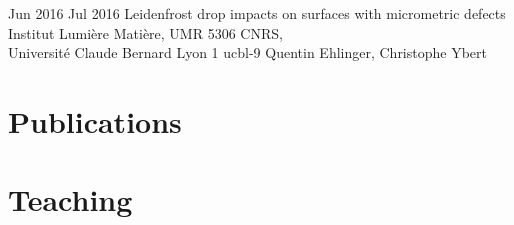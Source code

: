 \documentclass[letterpaper]{cvtemplate_en} %
\begin{document}
\begin{cvbody}
\cvitem
	{Jun 2016}
	{Jul 2016}
	{Leidenfrost drop impacts on surfaces with micrometric defects}
	{Institut Lumi\`ere Mati\`ere, UMR 5306 CNRS,\\
	Universit\'e Claude Bernard Lyon 1 }
	{ucbl}{}{-9}
	{Quentin Ehlinger, Christophe Ybert}
 	{\\
 	}

\end{cvbody}


\section{Publications}

\begin{cvbody}

\parbox[t]{\textwidth}{

\begin{refsection}
\nocite{*}
\setlength\bibitemsep{-5pt}
\printbibliography[heading=empty]
\end{refsection}

}

\end{cvbody}


\section{Teaching}
\end{document}
